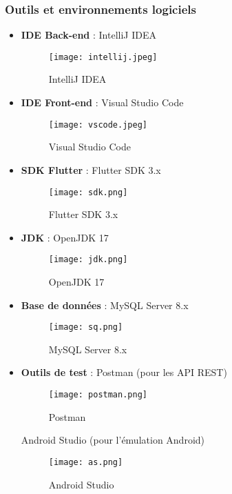 \documentclass[12pt,a4paper]{report}
\begin{document}
\subsubsection*{Outils et environnements logiciels}
\begin{itemize}
    \item \textbf{IDE Back-end} : IntelliJ IDEA
    \begin{figure}[H] 
    \centering
    \texttt{[image: intellij.jpeg]}
    \caption{IntelliJ IDEA }
    \label{fig:intellij}
\end{figure}
    \item \textbf{IDE Front-end} : Visual Studio Code
    \begin{figure}[H] 
    \centering
    \texttt{[image: vscode.jpeg]}
    \caption{Visual Studio Code}
    \label{fig:vscode}
\end{figure}
    \item \textbf{SDK Flutter} : Flutter SDK 3.x
      \begin{figure}[H] 
    \centering
    \texttt{[image: sdk.png]}
    \caption{Flutter SDK 3.x}
    \label{fig:sdk}
\end{figure}
    \item \textbf{JDK} : OpenJDK 17
         \begin{figure}[H] 
    \centering
    \texttt{[image: jdk.png]}
    \caption{OpenJDK 17}
    \label{fig:jdk}
\end{figure}
    \item \textbf{Base de données} : MySQL Server 8.x
             \begin{figure}[H] 
    \centering
    \texttt{[image: sq.png]}
    \caption{MySQL Server 8.x}
    \label{fig:sq}
\end{figure}
    \item \textbf{Outils de test} : Postman (pour les API REST)
                 \begin{figure}[H] 
    \centering
    \texttt{[image: postman.png]}
    \caption{Postman }
    \label{fig:postman}
\end{figure}
    Android Studio (pour l’émulation Android)
                     \begin{figure}[H] 
    \centering
    \texttt{[image: as.png]}
    \caption{Android Studio }
    \label{fig:AS}
\end{figure}
\end{itemize}
\end{document}
